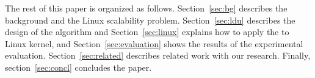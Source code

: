 The rest of this paper is organized as follows.
Section~\ref{sec:bg} describes the background and the Linux scalability problem.
Section~\ref{sec:ldu} describes the design of the \LDU algorithm and 
Section~\ref{sec:linux} explains how to apply the \LDU to Linux kernel, and
Section~\ref{sec:evaluation} shows the results of the experimental evaluation. 
Section~\ref{sec:related} describes related work with our research.
Finally, section~\ref{sec:concl} concludes the paper.
